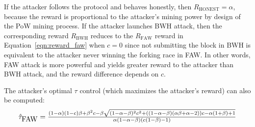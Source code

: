 If the attacker follows the protocol and behaves honestly, then $R_{\mbox{HONEST}}=\alpha$,
because the reward is proportional to the attacker's mining power by design of the PoW mining process.
If the attacker launches BWH attack, then the corresponding reward $R_{\mbox{BWH}}$ reduces to the $R_{\mbox{FAW}}$ reward in Equation~\ref{eqn:reward_faw} when $c=0$ since not submitting the block in BWH is equivalent to the attacker never winning the forking race in FAW. %
In other words, FAW attack is more powerful and yields greater reward to the attacker than BWH attack,
and the reward difference depends on $c$.

The attacker's optimal $\tau$ control (which maximizes the attacker's reward) can also be computed:
\begin{eqnarray}
\resizebox{.92\hsize}{!}{$
\hat{\tau}_{\mbox{FAW}}=\frac{(1-\alpha)(1-c)\beta+\beta^2c-\beta\sqrt{(1-\alpha-\beta)^2 c^2+((1-\alpha-\beta)(\alpha\beta+\alpha-2))c-\alpha(1+\beta)+1}} {\alpha(1-\alpha-\beta)(c(1-\beta)-1)}
$} 
\label{eqn:optimal_tau_faw}
\end{eqnarray}


